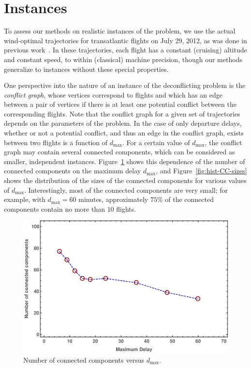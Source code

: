 \section{Instances}\label{sec:instances}
To assess our methods on realistic instances of the problem, we use the actual wind-optimal trajectories for transatlantic flights on July 29, 2012, as was done in previous work~\cite{rodionova16}.
In these trajectories, each flight has a constant (cruising) altitude 
and constant speed, to within (classical) machine precision,
though our methods generalize to instances without these special properties.

One perspective into the nature of an instance of the deconflicting problem is the \emph{conflict graph}, whose vertices correspond to flights and which has an edge between a pair of vertices if there is at least one potential conflict between the corresponding flights.
Note that the conflict graph for a given set of trajectories depends on the parameters of the problem.
In the case of only departure delays, whether or not a potential conflict, and thus an edge in the conflict graph, exists between two flights is a function of $d_{\max}$.
For a certain value of $d_{\max}$, the conflict graph may contain several connected components, which can be considered as smaller, independent instances.
Figure~\ref{fig:num-CCs-vs-dmax} shows this dependence of the number of connected components on the maximum delay $d_{\max}$,
and Figure~\ref{fig:hist-CC-sizes} shows the distribution of the sizes of the connected components for various values of $d_{\max}$.
Interestingly, 
most of the connected components are very small; for example, with $d_{\max}= 60$ minutes, approximately $75\%$ of the connected components contain no more than $10$ flights.

\begin{figure}[p]
\includegraphics[width=\columnwidth]{pics/instances/num_cc.pdf}
\caption[Number of connected components vs. $d_{\max}$]{Number of connected components versus $d_{\max}$.}
\label{fig:num-CCs-vs-dmax}
\end{figure}

